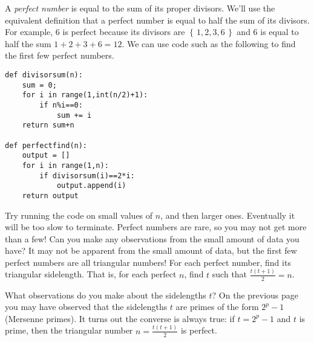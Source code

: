 \documentclass[12pt]{exam}
\newcommand{\set}[1]{\left\{\,#1\,\right\}}
\begin{document}
\begin{questions}
  \question A \emph{perfect number} is equal to the sum of its proper divisors. We'll use the equivalent definition that a perfect number is equal to half the sum of its divisors. For example, 6 is perfect because its divisors are $\set{1,2,3,6}$ and $6$ is equal to half the sum $1+2+3+6=12$. We can use code such as the following to find the first few perfect numbers.
  
  \begin{lstlisting}
def divisorsum(n):
    sum = 0;
    for i in range(1,int(n/2)+1):
        if n%i==0:
            sum += i
    return sum+n

def perfectfind(n):
    output = []
    for i in range(1,n):
        if divisorsum(i)==2*i:
            output.append(i)
    return output
  \end{lstlisting}
  
  Try running the code on small values of $n$, and then larger ones. Eventually it will be too slow to terminate. Perfect numbers are rare, so you may not get more than a few! Can you make any observations from the small amount of data you have?
  \newpage
  \question It may not be apparent from the small amount of data, but the first few perfect numbers are all triangular numbers! For each perfect number, find its triangular sidelength. That is, for each perfect $n$, find $t$ such that $\frac{t(t+1)}{2}=n$.
  \begin{center}
  \end{center}
  What observations do you make about the sidelengths $t$?
  \newpage
  \question On the previous page you may have observed that the sidelengths $t$ are primes of the form $2^p-1$ (Mersenne primes). It turns out the converse is always true: if $t=2^p-1$ and $t$ is prime, then the triangular number $n=\frac{t(t+1)}{2}$ is perfect.
\end{questions}
\end{document}
